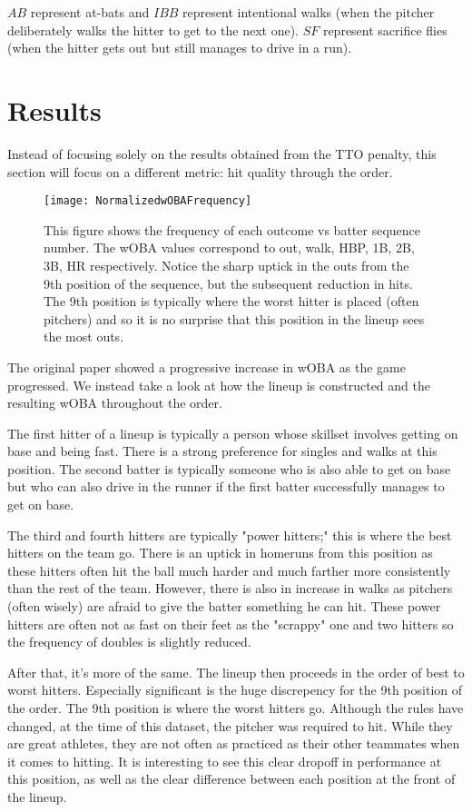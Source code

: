 \documentclass[a4paper,12pt]{article}
\begin{document}
$AB$ represent at-bats and $IBB$ represent intentional walks (when the pitcher deliberately walks the hitter to get to the next one). $SF$ represent sacrifice flies (when the hitter gets out but still manages to drive in a run).


\section{Results}
Instead of focusing solely on the results obtained from the TTO penalty, this section will focus on a different metric: hit quality through the order.

\begin{figure}[h]
\centering
\texttt{[image: NormalizedwOBAFrequency]}
\caption{This figure shows the frequency of each outcome vs batter sequence number. The wOBA values correspond to out, walk, HBP, 1B, 2B, 3B, HR respectively. Notice the sharp uptick in the outs from the 9th position of the sequence, but the subsequent reduction in hits. The 9th position is typically where the worst hitter is placed (often pitchers) and so it is no surprise that this position in the lineup sees the most outs.}
\end{figure}

The original paper showed a progressive increase in wOBA as the game progressed. We instead take a look at how the lineup is constructed and the resulting wOBA throughout the order.

The first hitter of a lineup is typically a person whose skillset involves getting on base and being fast. There is a strong preference for singles and walks at this position. The second batter is typically someone who is also able to get on base but who can also drive in the runner if the first batter successfully manages to get on base.

The third and fourth hitters are typically "power hitters;" this is where the best hitters on the team go. There is an uptick in homeruns from this position as these hitters often hit the ball much harder and much farther more consistently than the rest of the team. However, there is also in increase in walks as pitchers (often wisely) are afraid to give the batter something he can hit. These power hitters are often not as fast on their feet as the "scrappy" one and two hitters so the frequency of doubles is slightly reduced.

After that, it's more of the same. The lineup then proceeds in the order of best to worst hitters. Especially significant is the huge discrepency for the 9th position of the order. The 9th position is where the worst hitters go. Although the rules have changed, at the time of this dataset, the pitcher was required to hit. While they are great athletes, they are not often as practiced as their other teammates when it comes to hitting. It is interesting to see this clear dropoff in performance at this position, as well as the clear difference between each position at the front of the lineup.
\end{document}
